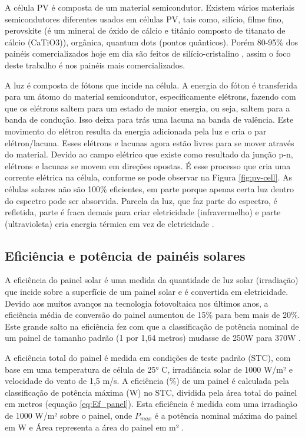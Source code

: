 A célula PV é composta de um material semicondutor. Existem vários materiais semicondutores diferentes usados em células PV, tais como, silício, filme fino, perovskite (é um mineral de óxido de cálcio e titânio composto de titanato de cálcio (CaTiO3)), orgânica, quantum dots (pontos quânticos). Porém 80-95\% dos painéis comercializados hoje em dia são feitos de silício-cristalino \cite{nrel_role}, assim o foco deste trabalho é nos painéis mais comercializados.

A luz é composta de fótons que incide na célula. A energia do fóton é transferida para um átomo do material semicondutor, especificamente elétrons, fazendo com que os elétrons saltem para um estado de maior energia, ou seja, saltem para a banda de condução. Isso deixa para trás uma lacuna na banda de valência. Este movimento do elétron resulta da energia adicionada pela luz e cria o par elétron/lacuna. Esses elétrons e lacunas agora estão livres para se mover através do material. Devido ao campo elétrico que existe como resultado da junção p-n, elétrons e lacunas se movem em direções opostas. É esse processo que cria uma corrente elétrica na célula, conforme se pode observar na Figura \ref{fig:pv-cell}. As células solares não são 100\% eficientes, em parte porque apenas certa luz dentro do espectro pode ser absorvida. Parcela da luz, que faz parte do espectro, é refletida, parte é fraca demais para criar eletricidade (infravermelho) e parte (ultravioleta) cria energia térmica em vez de eletricidade \cite{seia}.

\subsection{Eficiência e potência de painéis solares}

A eficiência do painel solar é uma medida da quantidade de luz solar (irradiação) que incide sobre a superfície de um painel solar e é convertida em eletricidade. Devido aos muitos avanços na tecnologia fotovoltaica nos últimos anos, a eficiência média de conversão do painel aumentou de 15\% para bem mais de 20\%. Este grande salto na eficiência fez com que a classificação de potência nominal de um painel de tamanho padrão (1 por 1,64 metros) mudasse de 250W para 370W \cite{cleanenergyreviews}.

A eficiência total do painel é medida em condições de teste padrão (STC), com base em uma temperatura de célula de 25° C, irradiância solar de 1000 W/m² e velocidade do vento de 1,5 m/s. A eficiência (\%) de um painel é calculada pela classificação de potência máxima (W) no STC, dividida pela área total do painel em metros (equação \ref{eq:Ef_panel}). Esta eficiência é medida com uma irradiação de 1000 W/m² sobre o painel, onde $P_{max}$ é a potência nominal máxima do painel em W e Área representa a área do painel em m²  \cite{cleanenergyreviews}.

